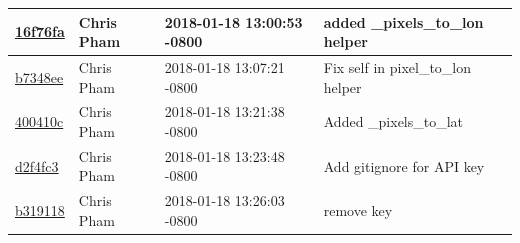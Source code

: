 \begin{center}
\begin{tabular}{l l l l}
\href{https://github.com/OSURoboticsClub/Rover_2017_2018/commit/16f76fad49699b346e15c0fdcfc2edcb814a0123}{16f76fa} & Chris Pham & 2018-01-18 13:00:53 -0800 &added \_pixels\_to\_lon helper\\\hline
\href{https://github.com/OSURoboticsClub/Rover_2017_2018/commit/b7348ee897a3bbff349d2d04d7c2084bc60c46f0}{b7348ee} & Chris Pham & 2018-01-18 13:07:21 -0800 &Fix self in pixel\_to\_lon helper\\\hline
\href{https://github.com/OSURoboticsClub/Rover_2017_2018/commit/400410cea4af92cb25fd1f686809f320c9cc102c}{400410c} & Chris Pham & 2018-01-18 13:21:38 -0800 &Added \_pixels\_to\_lat\\\hline
\href{https://github.com/OSURoboticsClub/Rover_2017_2018/commit/d2f4fc38fecf903ed35d731dafe566709707601c}{d2f4fc3} & Chris Pham & 2018-01-18 13:23:48 -0800 &Add gitignore for API key\\\hline
\href{https://github.com/OSURoboticsClub/Rover_2017_2018/commit/b319118e1d32c8d655afe7a6cd084916d16f8db3}{b319118} & Chris Pham & 2018-01-18 13:26:03 -0800 &remove key\\\hline
\end{tabular}
\end{center}
